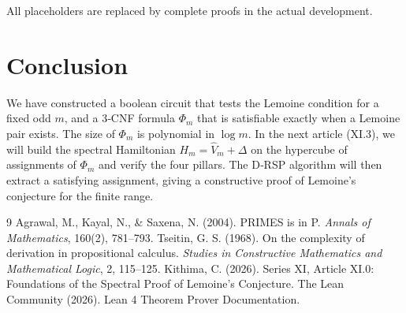 \documentclass[11pt,a4paper]{article}
\begin{document}
All placeholders are replaced by complete proofs in the actual development.

\section{Conclusion}

We have constructed a boolean circuit that tests the Lemoine condition for a fixed odd \(m\), and a 3‑CNF formula \(\Phi_m\) that is satisfiable exactly when a Lemoine pair exists. The size of \(\Phi_m\) is polynomial in \(\log m\). In the next article (XI.3), we will build the spectral Hamiltonian \(H_m = \hat{V}_m + \Delta\) on the hypercube of assignments of \(\Phi_m\) and verify the four pillars. The D‑RSP algorithm will then extract a satisfying assignment, giving a constructive proof of Lemoine's conjecture for the finite range.


\begin{thebibliography}{9}
  Agrawal, M., Kayal, N., \& Saxena, N. (2004). PRIMES is in P. \emph{Annals of Mathematics}, 160(2), 781–793.
  Tseitin, G. S. (1968). On the complexity of derivation in propositional calculus. \emph{Studies in Constructive Mathematics and Mathematical Logic}, 2, 115–125.
  Kithima, C. (2026). Series XI, Article XI.0: Foundations of the Spectral Proof of Lemoine's Conjecture.
  The Lean Community (2026). Lean 4 Theorem Prover Documentation.
\end{thebibliography}
\end{document}
